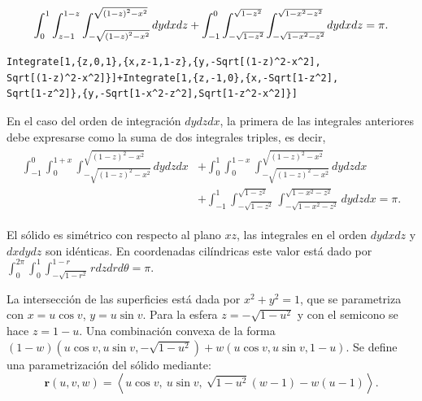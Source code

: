 \begingroup
\setlength{\abovedisplayskip}{0pt}
\setlength{\abovedisplayshortskip}{0pt}
\begin{gather*}
\displaystyle \int_{0}^{1}\int_{z-1}^{1-z}\int_{-\sqrt{\left( 1-z\right)^2-x^2}}^{\sqrt{\left( 1-z\right) ^2-x^2}}dydxdz+\int_{-1}^{0}\int_{-\sqrt{1-z^2}}^{\sqrt{1-z^2}}\int_{-\sqrt{1-x^2-z^2}}^{\sqrt{1-x^2-z^2}}dydxdz=\pi.
\end{gather*}
\endgroup


\begin{tcolorbox}[title=\bf Instrucción en \verb"Mathematica"]\begin{Verbatim}[formatcom=\letraverbatim]
Integrate[1,{z,0,1},{x,z-1,1-z},{y,-Sqrt[(1-z)^2-x^2],
Sqrt[(1-z)^2-x^2]}]+Integrate[1,{z,-1,0},{x,-Sqrt[1-z^2],
Sqrt[1-z^2]},{y,-Sqrt[1-x^2-z^2],Sqrt[1-z^2-x^2]}]
\end{Verbatim}
\end{tcolorbox}

En el caso del orden de integración $dydzdx$, la primera de las integrales anteriores debe expresarse como la suma de dos integrales triples, es decir,
\begin{gather*}
\begin{aligned}
\int_{-1}^{0}\int_{0}^{1+x}\int_{-\sqrt{(1-z)^2-x^2}}^{\sqrt{(1-z)^2-x^2}}dydzdx&+\int_{0}^{1}\int_{0}^{1-x}\int_{-\sqrt{\left( 1-z\right) ^2-x^2}}^{\sqrt{\left( 1-z\right) ^2-x^2}}dydzdx\\
&+\int_{-1}^{1}\int_{-\sqrt{1-z^2}}^{\sqrt{1-z^2}}\int_{-\sqrt{1-x^2-z^2}}^{\sqrt{1-x^2-z^2}}dydzdx = \pi.
\end{aligned}
\end{gather*}

El sólido es simétrico con respecto al plano $xz$, las integrales en el orden $dydxdz$ y $dxdydz$ son idénticas.
En coordenadas cilíndricas este valor está dado por
$\int_{0}^{2\pi }\int_{0}^{1}\int_{-\sqrt{1-r^2}}^{1-r}rdzdrd\theta = \pi$.

\enlargethispage*{\baselineskip}

La intersección de las superficies está dada por
$x^2+y^2=1$, que se parametriza con
$x= u\cos v$, $y=u\sin v$. Para la esfera $z= -\sqrt{1-u^2}$
y con el semicono se hace $z=1-u$. Una combinación convexa de la forma
$\left( 1-w\right) \left( u\cos v,u\sin v,-\sqrt{1-u^2}\right) +w\left(u\cos v,u\sin v,1-u\right)$.
Se define una parametrización del sólido mediante:
\[
\mathbf{r}(u, v, w) =
\left\langle
u\cos v,\
u\sin v,\
\sqrt{1 - u^2}(w - 1) - w(u - 1)
\right\rangle.
\]

